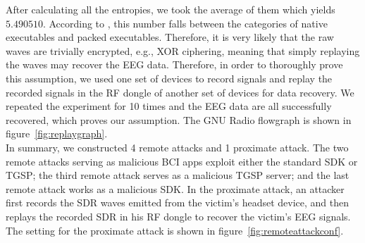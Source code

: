 %
\indent After calculating all the entropies, we took the average of them which yields $5.490510$. According to \cite{lyda2007using}, this number falls between the categories of native executables and packed executables. Therefore, it is very likely that the raw waves are trivially encrypted, e.g., XOR ciphering, meaning that simply replaying the waves may recover the EEG data. Therefore, in order to thoroughly prove this assumption, we used one set of devices to record signals and replay the recorded signals in the RF dongle of another set of devices for data recovery. We repeated the experiment for 10 times and the EEG data are all successfully recovered, which proves our assumption. The GNU Radio flowgraph is shown in figure~\ref{fig:replaygraph}.\\
%
\indent In summary, we constructed 4 remote attacks and 1 proximate attack. The two remote attacks serving as malicious BCI apps exploit either the standard SDK or TGSP; the third remote attack serves as a malicious TGSP server; and the last remote attack works as a malicious SDK. In the proximate attack, an attacker first records the SDR waves emitted from the victim's headset device, and then replays the recorded SDR in his RF dongle to recover the victim's EEG signals. The setting for the proximate attack is shown in figure~\ref{fig:remoteattackconf}.

